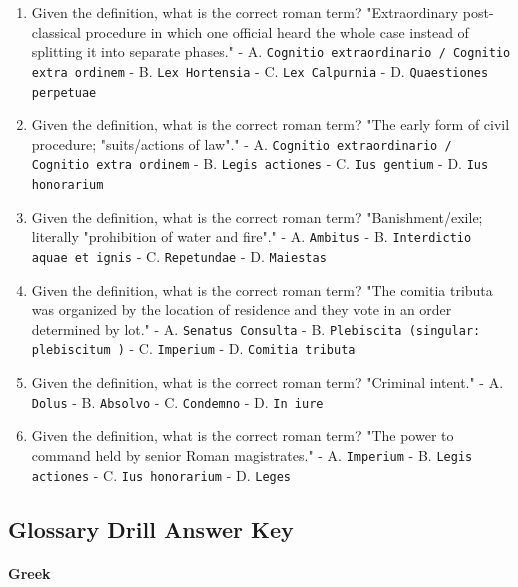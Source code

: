 \documentclass[11pt]{article}
\begin{document}
\begin{enumerate}
\item Given the definition, what is the correct roman term? "Extraordinary post-classical procedure in which one official heard the whole case instead of splitting it into separate phases." - A. \texttt{Cognitio extraordinario / Cognitio extra ordinem} - B. \texttt{Lex Hortensia} - C. \texttt{Lex Calpurnia} - D. \texttt{Quaestiones perpetuae}
\item Given the definition, what is the correct roman term? "The early form of civil procedure; "suits/actions of law"." - A. \texttt{Cognitio extraordinario / Cognitio extra ordinem} - B. \texttt{Legis actiones} - C. \texttt{Ius gentium} - D. \texttt{Ius honorarium}
\item Given the definition, what is the correct roman term? "Banishment/exile; literally "prohibition of water and fire"." - A. \texttt{Ambitus} - B. \texttt{Interdictio aquae et ignis} - C. \texttt{Repetundae} - D. \texttt{Maiestas}
\item Given the definition, what is the correct roman term? "The comitia tributa was organized by the location of residence and they vote in an order determined by lot." - A. \texttt{Senatus Consulta} - B. \texttt{Plebiscita (singular: plebiscitum )} - C. \texttt{Imperium} - D. \texttt{Comitia tributa}
\item Given the definition, what is the correct roman term? "Criminal intent." - A. \texttt{Dolus} - B. \texttt{Absolvo} - C. \texttt{Condemno} - D. \texttt{In iure}
\item Given the definition, what is the correct roman term? "The power to command held by senior Roman magistrates." - A. \texttt{Imperium} - B. \texttt{Legis actiones} - C. \texttt{Ius honorarium} - D. \texttt{Leges}
\end{enumerate}

\subsection{Glossary Drill Answer Key}

\paragraph{Greek}
\end{document}
